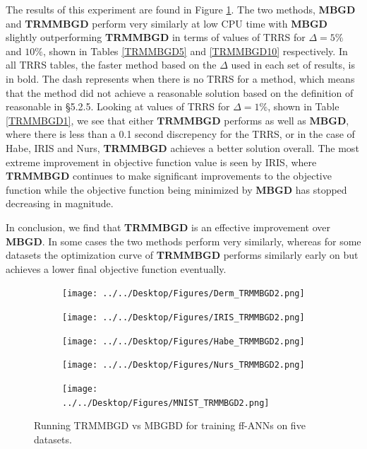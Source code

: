 \documentclass[letterpaper,12pt,titlepage,oneside,final]{book}
\begin{document}
	The results of this experiment are found in Figure \ref{figure:TRMMBGD}. The two methods, \textbf{MBGD} and \textbf{TRMMBGD} perform very similarly at low CPU time with \textbf{MBGD} slightly outperforming \textbf{TRMMBGD} in terms of values of TRRS for $\Delta=5\%$ and $10\%$, shown in Tables \ref{TRMMBGD5} and \ref{TRMMBGD10} respectively.  In all TRRS tables, the faster method based on the $\Delta$ used in each set of results, is in bold. The dash represents when there is no TRRS for a method, which means that the method did not achieve a reasonable solution based on the definition of reasonable in \S{5.2.5}. Looking at values of TRRS for $\Delta=1\%$, shown in Table \ref{TRMMBGD1}, we see that either $\textbf{TRMMBGD}$ performs as well as $\mathbf{MBGD}$, where there is less than a 0.1 second discrepency for the TRRS, or in the case of Habe, IRIS and Nurs, \textbf{TRMMBGD} achieves a better solution overall. The most extreme improvement in objective function value is seen by IRIS, where \textbf{TRMMBGD} continues to make significant improvements to the objective function while the objective function being minimized by \textbf{MBGD} has stopped decreasing in magnitude.
	
	In conclusion, we find that \textbf{TRMMBGD} is an effective improvement over \textbf{MBGD}. In some cases the two methods perform very similarly, whereas for some datasets the optimization curve of \textbf{TRMMBGD} performs similarly early on but achieves a lower final objective function eventually. 
	
	
	\begin{figure}
		\centering
		\begin{subfigure}{.45\textwidth}
			\texttt{[image: ../../Desktop/Figures/Derm\_TRMMBGD2.png]}
		\end{subfigure}
		\begin{subfigure}{.45\textwidth}
			\texttt{[image: ../../Desktop/Figures/IRIS\_TRMMBGD2.png]}
		\end{subfigure}
		\begin{subfigure}{.45\textwidth}
			\texttt{[image: ../../Desktop/Figures/Habe\_TRMMBGD2.png]}
		\end{subfigure}
		\begin{subfigure}{.45\textwidth}
			\texttt{[image: ../../Desktop/Figures/Nurs\_TRMMBGD2.png]}
		\end{subfigure}
		\begin{subfigure}{.45\textwidth}
			\texttt{[image: ../../Desktop/Figures/MNIST\_TRMMBGD2.png]}
		\end{subfigure}
		\caption{Running TRMMBGD vs MBGBD for training ff-ANNs on five datasets.}
		\label{figure:TRMMBGD}
	\end{figure}
	
\end{document}
